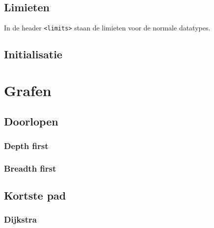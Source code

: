\documentclass[10pt,hidelinks]{article}
\begin{document}
\subsection{Limieten}
In de header \texttt{<limits>} staan de limieten voor de normale datatypes.


\subsection{Initialisatie}



\pagebreak

\section{Grafen}

\subsection{Doorlopen}

\subsubsection{Depth first}



\subsubsection{Breadth first}



\subsection{Kortste pad}

\subsubsection{Dijkstra}


\end{document}
